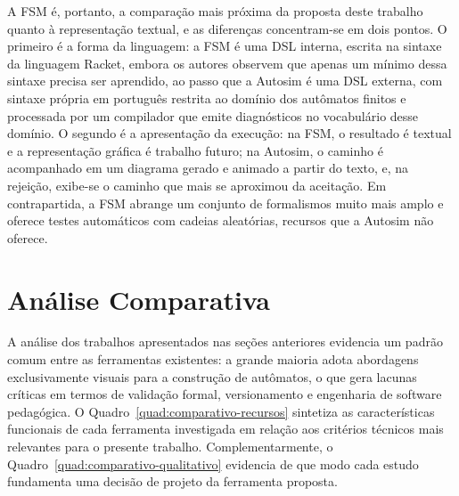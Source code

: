 \documentclass[
    12pt
    ,oneside
    ,a4paper
    ,chapter=TITLE
    ,section=TITLE
    ,sumario=abnt-6027-2012]{abntex2}
\begin{document}
A FSM é, portanto, a comparação mais próxima da proposta deste trabalho quanto à
representação textual, e as diferenças concentram-se em dois pontos. O primeiro é a forma
da linguagem: a FSM é uma DSL interna, escrita na sintaxe da linguagem Racket, embora os
autores observem que apenas um mínimo dessa sintaxe precisa ser aprendido, ao passo que a
Autosim é uma DSL externa, com sintaxe própria em português restrita ao domínio dos autômatos
finitos e processada por um compilador que emite diagnósticos no vocabulário desse domínio.
O segundo é a apresentação da execução: na FSM, o resultado é textual e a representação
gráfica é trabalho futuro; na Autosim, o caminho é acompanhado em um diagrama gerado e
animado a partir do texto, e, na rejeição, exibe-se o caminho que mais se aproximou da
aceitação. Em contrapartida, a FSM abrange um conjunto de formalismos muito mais amplo e
oferece testes automáticos com cadeias aleatórias, recursos que a Autosim não oferece.

\section{Análise Comparativa}
\label{sec:rel-comparativa}

A análise dos trabalhos apresentados nas seções anteriores evidencia um padrão comum entre as
ferramentas existentes: a grande maioria adota abordagens exclusivamente visuais para a
construção de autômatos, o que gera lacunas críticas em termos de validação formal,
versionamento e engenharia de software pedagógica. O Quadro~\ref{quad:comparativo-recursos}
sintetiza as características funcionais de cada ferramenta investigada em relação aos critérios
técnicos mais relevantes para o presente trabalho. Complementarmente, o
Quadro~\ref{quad:comparativo-qualitativo} evidencia de que modo cada estudo fundamenta uma
decisão de projeto da ferramenta proposta.
\end{document}
